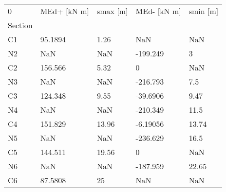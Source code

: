 \begin{tabular}{lllll}
\toprule
0 & MEd+ [kN m] & smax [m] & MEd- [kN m] & smin [m] \\
Section &             &          &             &          \\
\midrule
C1      &     95.1894 &     1.26 &         NaN &      NaN \\
N2      &         NaN &      NaN &    -199.249 &        3 \\
C2      &     156.566 &     5.32 &           0 &      NaN \\
N3      &         NaN &      NaN &    -216.793 &      7.5 \\
C3      &     124.348 &     9.55 &    -39.6906 &     9.47 \\
N4      &         NaN &      NaN &    -210.349 &     11.5 \\
C4      &     151.829 &    13.96 &    -6.19056 &    13.74 \\
N5      &         NaN &      NaN &    -236.629 &     16.5 \\
C5      &     144.511 &    19.56 &           0 &      NaN \\
N6      &         NaN &      NaN &    -187.959 &    22.65 \\
C6      &     87.5808 &       25 &         NaN &      NaN \\
\bottomrule
\end{tabular}
